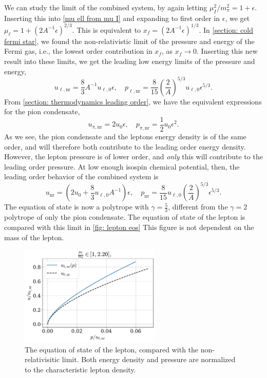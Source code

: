 We can study the limit of the combined system, by again letting $\mu_I^2/m_\pi^2 = 1 + \epsilon$.
Inserting this into \autoref{mu ell from mu I} and expanding to first order in $\epsilon$, we get $\mu_\ell = 1 + (2 A^{-1} \epsilon)^{2/3} $.
This is equivalent to $x_f = (2 A^{-1} \epsilon)^{1/3} $.
In \autoref{section: cold fermi star}, we found the non-relativistic limit of the pressure and energy of the Fermi gas, i.e., the lowest order contribution in $x_f$, as $x_f \rightarrow 0$.
Inserting this new result into these limits, we get the leading low energy limits of the pressure and energy, 
%
\begin{equation}
    u_{\ell, \text{nr}} = \frac{8}{3} A^{-1} u_{\ell,0} \epsilon, \quad
    p_{\ell, \text{nr}} = \frac{8}{15} \left(\frac{2}{A} \right)^{5/3}  u_{\ell,0}  \epsilon^{5/3}.
\end{equation}
%
From \autoref{section: thermodynamics leading order}, we have the equivalent expressions for the pion condensate,
%
\begin{equation}
    u_{\pi, \text{nr}} = 2 u_0 \epsilon, \quad p_{\pi, \text{nr}} = \frac{1}{2} u_0 \epsilon^2.
\end{equation}
%
As we see, the pion condensate and the leptons energy density is of the same order, and will therefore both contribute to the leading order energy density.
However, the lepton pressure is of lower order, and \emph{only} this will contribute to the leading order pressure.
At low enough isospin chemical potential, then, the leading order behavior of the combined system is
%
\begin{equation}
    u_{\text{nr}} = \left(2 u_0 + \frac{8}{3} u_{\ell,0} A^{-1} \right)\epsilon ,\quad
    p_{\text{nr}} = \frac{8}{15} u_{\ell,0} \left(\frac{2}{A} \right)^{5/3} \epsilon^{5/3}.
\end{equation}
%
The equation of state is now a polytrope with $\gamma = \frac{5}{3}$, different from the $\gamma = 2$ polytrope of only the pion condensate.
The equation of state of the lepton is compared with this limit in \autoref{fig: lepton eos}
This figure is not dependent on the mass of the lepton.

\begin{figure}
    \centering
    \includegraphics[width=0.6\textwidth]{../scripts/figurer/charge_neutrality/eos_lepton.pdf}
    \caption{The equation of state of the lepton, compared with the non-relativisitic limit.
    Both energy density and pressure are normalized to the characteristic lepton density.}
    \label{fig: lepton eos}
\end{figure}


